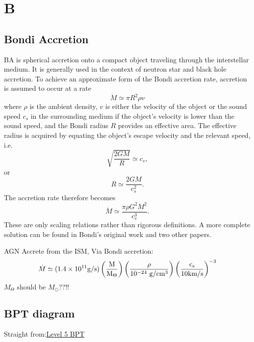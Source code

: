 \documentclass[11pt]{article}
\begin{document}
\section{B}
    \subsection{Bondi Accretion}
    BA is spherical accretion onto a compact object traveling through
the interstellar medium. It is generally used in the context of
neutron star and black hole accretion. To achieve an approximate form
of the Bondi accretion rate, accretion is assumed to occur at a rate
\begin{equation}
  \dot {M}\simeq \pi R^{2}\rho v
\end{equation}
where $\rho$ is the ambient density, $v$ is either the velocity of the
object or the sound speed $ c_{s}$ in the surrounding medium if the
object's velocity is lower than the sound speed, and the Bondi radius
$R$ provides an effective area. The effective radius is acquired by
equating the object's escape velocity and the relevant speed, i.e.
\begin{equation}
  \sqrt{\frac{2 G M}{R}} \simeq c_s, 
\end{equation}
or
\begin{equation}
  R\simeq\frac{2 G M}{c_s^2}.
\end{equation}
The accretion rate therefore becomes
\begin{equation}
\dot {M} \simeq \frac{\pi \rho G^{2}M^{2}}{c_{s}^{3}} .
\end{equation}
These are only scaling relations rather than rigorous definitions. A
more complete solution can be found in Bondi's original work and two
other papers.

AGN Accrete from the ISM, Via Bondi accretion:
    \begin{equation}
      \dot{M} \simeq (1.4\times10^{11} \rm{g/s}) \left( \frac{M}{M_{\Theta}} \right) \left( \frac{\rho}{10^{-24}\ \rm{g / cm^{3}}} \right)  \left( \frac{c_s}{10 \rm{km/s}} \right)^{-3}
    \end{equation}
 $M_{\Theta}$ should be $M_{\odot}$??!!

    
    \subsection{BPT diagram}
    Straight from:\href{http://ned.ipac.caltech.edu/level5/Glossary/Essay_bpt.html}{Level 5 BPT}
    
\end{document}
